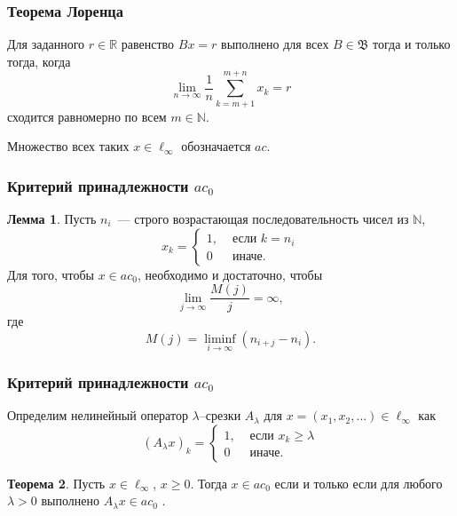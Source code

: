 \documentclass[10pt,pdf,hyperref={unicode}]{beamer}
\theoremstyle{definition}
\newtheorem{llemma}{Лемма}
\newtheorem{ttheorem}[llemma]{Теорема}
\begin{document}
\begin{frame}\frametitle{Теорема Лоренца}
	Для заданного $r\in\mathbb{R}$ равенство $Bx=r$ выполнено для всех $B\in\mathfrak{B}$
	тогда и только тогда, когда
	\begin{equation*}
		\lim_{n\to\infty} \frac{1}{n} \sum_{k=m+1}^{m+n} x_k = r
	\end{equation*}
	сходится равномерно по всем $m\in\mathbb{N}$.

	Множество всех таких $x \in \ell_\infty$ обозначается $ac$.
\end{frame}



\begin{frame}
	\frametitle{Критерий принадлежности $ac_0$~\cite{our-mz2019ac0}}


	\begin{llemma}
		Пусть $n_i$~--- строго возрастающая последовательность чисел из $\mathbb{N}$,
		\begin{equation*}
			x_k = \left\{\begin{array}{ll}
				1, & \mbox{~если~} k = n_i
				\\
				0  & \mbox{~иначе.~}
			\end{array}\right.
		\end{equation*}
		Для того, чтобы $x\in ac_0$,
		необходимо и достаточно, чтобы
		\begin{equation}\label{lim_M(j)/j}
			\lim_{j \to \infty} \frac{M(j)}{j} = \infty
			,
		\end{equation}
		где
		\begin{equation*}
			M(j) = \liminf_{i\to\infty} (n_{i+j} - n_i)
			.
		\end{equation*}
	\end{llemma}


\end{frame}



\begin{frame}
	\frametitle{Критерий принадлежности $ac_0$~\cite{our-mz2019ac0}}


	Определим нелинейный оператор $\lambda$--срезки $A_\lambda$
	для $x = (x_1, x_2, ...)\in\ell_\infty$ как
	\begin{equation*}
		(A_\lambda x)_k = \begin{cases}
			1, & \mbox{~если~} x_k \geq \lambda
			\\
			0  & \mbox{~иначе.~}
		\end{cases}
	\end{equation*}

	\begin{ttheorem}
		\label{thm:lambda_prelim}
		Пусть $x\in\ell_\infty$, $x\geq 0$.
		Тогда
		$
			x\in ac_0
		$
		если и только если
		для любого $\lambda > 0$
		выполнено
		$
			A_\lambda x \in ac_0
		$
		.
	\end{ttheorem}

\end{frame}
\end{document}
